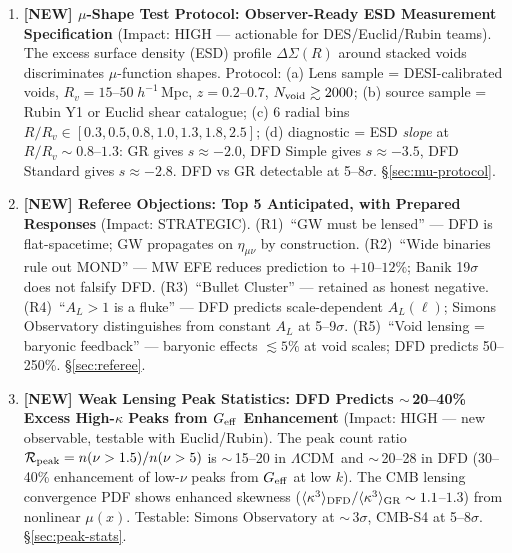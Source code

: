 \documentclass[11pt,a4paper]{article}
\newcommand{\LCDM}{$\Lambda$CDM}
\newcommand{\Geff}{G_{\rm eff}}
\begin{document}
\begin{tcolorbox}[colback=yellow!5!white, colframe=red!70!black,
  title=\textbf{TOP 5 FINDINGS --- WAVE 4, ITERATION 16}]
\begin{enumerate}
\item \textbf{[NEW] $\mu$-Shape Test Protocol: Observer-Ready ESD
  Measurement Specification} (Impact: HIGH --- actionable for
  DES/Euclid/Rubin teams).
  The excess surface density (ESD) profile $\Delta\Sigma(R)$ around
  stacked voids discriminates $\mu$-function shapes.  Protocol: (a)
  Lens sample = DESI-calibrated voids, $R_v = 15$--$50\;h^{-1}$\,Mpc,
  $z = 0.2$--$0.7$, $N_{\rm void} \gtrsim 2000$; (b) source sample =
  Rubin Y1 or Euclid shear catalogue; (c) 6 radial bins $R/R_v \in
  [0.3, 0.5, 0.8, 1.0, 1.3, 1.8, 2.5]$; (d) diagnostic = ESD
  \emph{slope} at $R/R_v \sim 0.8$--$1.3$: GR gives $s \approx -2.0$,
  DFD Simple gives $s \approx -3.5$, DFD Standard gives $s \approx -2.8$.
  DFD vs GR detectable at 5--8$\sigma$.
  \S\ref{sec:mu-protocol}.

\item \textbf{[NEW] Referee Objections: Top 5 Anticipated, with
  Prepared Responses} (Impact: STRATEGIC).
  (R1)~``GW must be lensed'' --- DFD is flat-spacetime; GW propagates
  on $\eta_{\mu\nu}$ by construction.
  (R2)~``Wide binaries rule out MOND'' --- MW EFE reduces prediction
  to $+10$--$12\%$; Banik 19$\sigma$ does not falsify DFD.
  (R3)~``Bullet Cluster'' --- retained as honest negative.
  (R4)~``$A_L > 1$ is a fluke'' --- DFD predicts scale-dependent
  $A_L(\ell)$; Simons Observatory distinguishes from constant $A_L$
  at 5--9$\sigma$.
  (R5)~``Void lensing = baryonic feedback'' --- baryonic effects
  $\lesssim 5\%$ at void scales; DFD predicts 50--250\%.
  \S\ref{sec:referee}.

\item \textbf{[NEW] Weak Lensing Peak Statistics: DFD Predicts
  $\sim$\,20--40\% Excess High-$\kappa$ Peaks from $\Geff$ Enhancement}
  (Impact: HIGH --- new observable, testable with Euclid/Rubin).
  The peak count ratio $\mathcal{R}_{\rm peak} = n(\nu > 1.5)/n(\nu > 5)$
  is $\sim$\,15--20 in \LCDM\ and $\sim$\,20--28 in DFD (30--40\%
  enhancement of low-$\nu$ peaks from $\Geff$ at low $k$).  The CMB
  lensing convergence PDF shows enhanced skewness
  ($\langle\kappa^3\rangle_{\rm DFD}/\langle\kappa^3\rangle_{\rm GR}
  \sim 1.1$--$1.3$) from nonlinear $\mu(x)$.  Testable: Simons
  Observatory at $\sim$\,3$\sigma$, CMB-S4 at 5--8$\sigma$.
  \S\ref{sec:peak-stats}.

\end{enumerate}

\end{tcolorbox}


\end{document}
